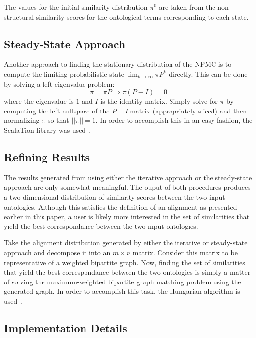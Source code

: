 \documentclass[letterpaper,twocolumn,12pt]{article}
\begin{document}
\noindent The values for the initial similarity distribution $\pi^0$ are taken from the non-structural similarity scores for the ontological terms corresponding to each state.

\subsection{Steady-State Approach}

Another approach to finding the stationary distribution of the NPMC is to compute the limiting probabilistic state $\lim_{k \to \infty} \pi P^k$ directly.
This can be done by solving a left eigenvalue problem: 
$$ \pi = \pi P \Rightarrow \pi (P - I) = 0$$
where the eigenvalue is $1$ and $I$ is the identity matrix. 
Simply solve for $\pi$ by computing the left nullspace of the $P - I$ matrix (appropriately sliced) and then normalizing $\pi$ so that $\vert\vert \pi \vert\vert = 1$.
In order to accomplish this in an easy fashion, the ScalaTion library was used~\cite{miller:2010:scalation}.

\subsection{Refining Results}

The results generated from using either the iterative approach or the steady-state approach are only somewhat meaningful.
The ouput of both procedures produces a two-dimensional distribution of similarity scores between the two input ontologies.
Although this satisfies the definition of an alignment as presented earlier in this paper, a user is likely more interested in the set of similarities that yield the best correspondance between the two input ontologies.

Take the alignment distribution generated by either the iterative or steady-state approach and decompose it into an $m \times n$ matrix.
Consider this matrix to be representative of a weighted bipartite graph.
Now, finding the set of similarities that yield the best correspondance between the two ontologies is simply a matter of solving the maximum-weighted bipartite graph matching problem using the generated graph.
In order to accomplish this task, the Hungarian algorithm is used~\cite{kuhn:1955:hungarian}.

\subsection{Implementation Details}
\end{document}
